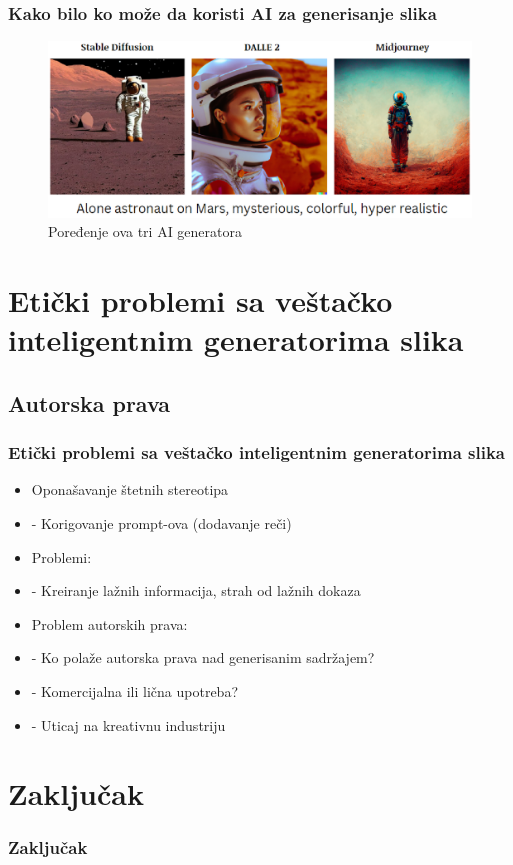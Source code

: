 \documentclass{beamer}
\begin{document}
\begin{frame}[fragile]\frametitle{Kako bilo ko može da koristi AI za generisanje slika}
	
\begin{figure}[htp]
\centering
\includegraphics[width=1\textwidth]{astronaut.eps}
\caption{Poređenje ova tri AI generatora}
\label{fig: Astronaut}
\end{figure}
	
\end{frame}


\section{Etički problemi sa veštačko inteligentnim generatorima slika} %
\subsection{Autorska prava}

\begin{frame}[fragile]\frametitle{Etički problemi sa veštačko inteligentnim generatorima slika}
	
	\begin{itemize}
		\item Oponašavanje štetnih stereotipa
        \item[]  - Korigovanje prompt-ova (dodavanje reči)
        \item Problemi:
        \item[] - Kreiranje lažnih informacija, strah od lažnih dokaza
        \item Problem autorskih prava:
		\item[] - Ko polaže autorska prava nad generisanim sadržajem?
		\item[] - Komercijalna ili lična upotreba?
		\item[] - Uticaj na kreativnu industriju
	\end{itemize}	
	
\end{frame}

\section{Zaključak} %

\begin{frame}[fragile]\frametitle{Zaključak}
	
\end{frame}
\end{document}
